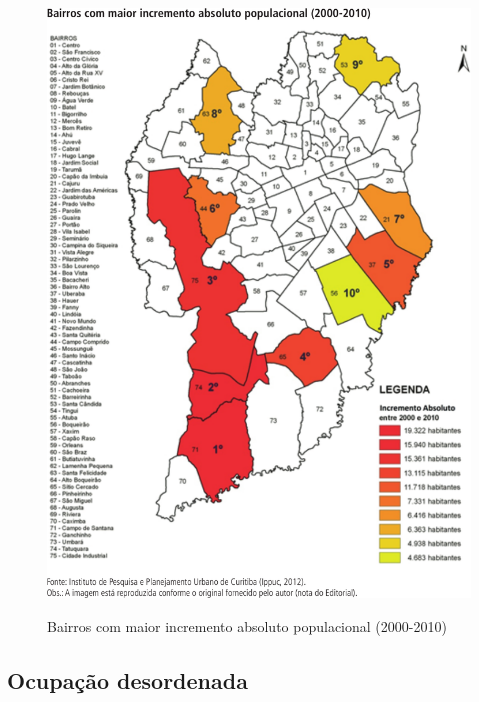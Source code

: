 	\begin{figure}
		\centering
		\caption{Bairros com maior incremento absoluto populacional (2000-2010)}
		\includegraphics[width=1.0\linewidth]{img/costa2015a_04}
		\label{fig:costa2015a_04}
	\end{figure}
    
	\subsection{Ocupação desordenada} \label{sec:ocupacaodesordenada}
	
